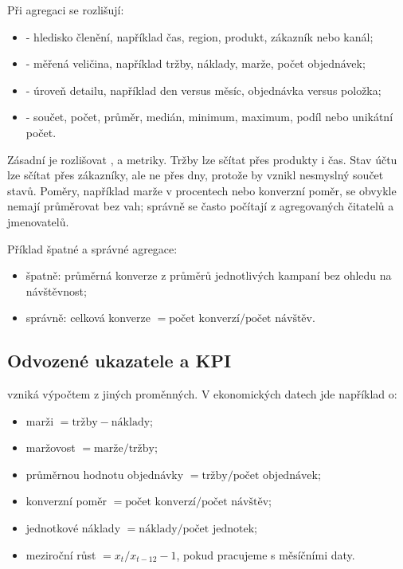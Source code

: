 Při agregaci se rozlišují:
\begin{itemize}
  \item {} - hledisko členění, například čas, region, produkt, zákazník nebo kanál;
  \item {} - měřená veličina, například tržby, náklady, marže, počet objednávek;
  \item {} - úroveň detailu, například den versus měsíc, objednávka versus položka;
  \item {} - součet, počet, průměr, medián, minimum, maximum, podíl nebo unikátní
  počet.
\end{itemize}

Zásadní je rozlišovat ,  a  metriky. Tržby lze
sčítat přes produkty i čas. Stav účtu lze sčítat přes zákazníky, ale ne přes dny, protože by vznikl
nesmyslný součet stavů. Poměry, například marže v procentech nebo konverzní poměr, se obvykle nemají
průměrovat bez vah; správně se často počítají z agregovaných čitatelů a jmenovatelů.

Příklad špatné a správné agregace:
\begin{itemize}
  \item špatně: průměrná konverze z průměrů jednotlivých kampaní bez ohledu na návštěvnost;
  \item správně: celková konverze \(= \text{počet konverzí} / \text{počet návštěv}\).
\end{itemize}

\subsection{Odvozené ukazatele a KPI}
 vzniká výpočtem z jiných proměnných. V ekonomických datech jde například o:
\begin{itemize}
  \item marži \(= \text{tržby} - \text{náklady}\);
  \item maržovost \(= \text{marže} / \text{tržby}\);
  \item průměrnou hodnotu objednávky \(= \text{tržby} / \text{počet objednávek}\);
  \item konverzní poměr \(= \text{počet konverzí} / \text{počet návštěv}\);
  \item jednotkové náklady \(= \text{náklady} / \text{počet jednotek}\);
  \item meziroční růst \(= x_t/x_{t-12}-1\), pokud pracujeme s měsíčními daty.
\end{itemize}

